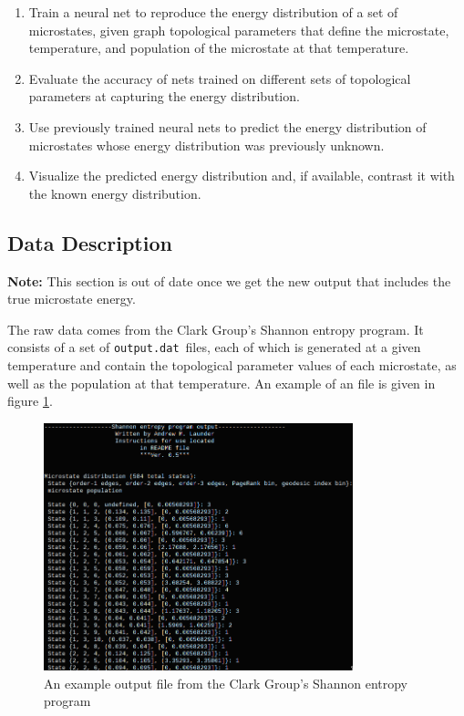 \documentclass[paper=a4, fontsize=12pt]{article}
\begin{document}
\begin{enumerate}
  \item Train a neural net to reproduce the energy distribution of a set of microstates,
    given graph topological parameters that define the microstate, temperature, and population of the microstate at that temperature.
  \item Evaluate the accuracy of nets trained on different sets of topological parameters at capturing the energy distribution. 
  \item Use previously trained neural nets to predict the energy distribution of microstates whose energy distribution was previously unknown.
  \item Visualize the predicted energy distribution and, if available, contrast it with the known energy distribution.
\end{enumerate}

\subsection*{Data Description}

\textbf{Note:} This section is out of date once we get the new output that includes the true microstate energy.


\vspace{1em}

\noindent The raw data comes from the Clark Group's Shannon entropy program.
It consists of a set of \texttt{output.dat}\ files,
each of which is generated at a given temperature
and contain the topological parameter values of each microstate, as well as the population at that temperature.
An example of an  file is given in figure \ref{output}.

\begin{figure}
  \centering
  \includegraphics[width=0.8\textwidth]{output_file}
  \caption[width=0.8\textwidth]{An example output file from the Clark Group's Shannon entropy program}
  \label{output}
\end{figure}
\end{document}
